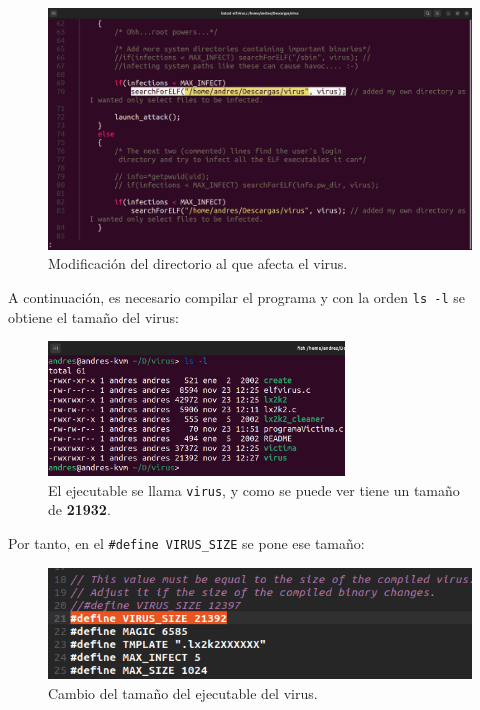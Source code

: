\documentclass{article}
\begin{document}
\begin{figure}[H]
    \includegraphics[width=\textwidth]{imagenes/Captura desde 2022-11-25 17-29-47.png}
    \caption{Modificación del directorio al que afecta el virus.}
\end{figure}


A continuación, es necesario compilar el programa y con la orden \verb|ls -l| se obtiene el tamaño del virus:

\begin{figure}[H]
    \centering
    \includegraphics[width=0.7\textwidth]{imagenes/Captura desde 2022-11-23 12-28-06.png}
    \caption{El ejecutable se llama \texttt{virus}, y como se puede ver tiene un tamaño de \textbf{21932}.}
\end{figure}

\newpage

Por tanto, en el \verb|#define VIRUS_SIZE| se pone ese tamaño:

\begin{figure}[H]
    \includegraphics[width=\textwidth]{imagenes/Captura desde 2022-11-23 12-29-27.png}
    \caption{Cambio del tamaño del ejecutable del virus.}
\end{figure}
\end{document}
